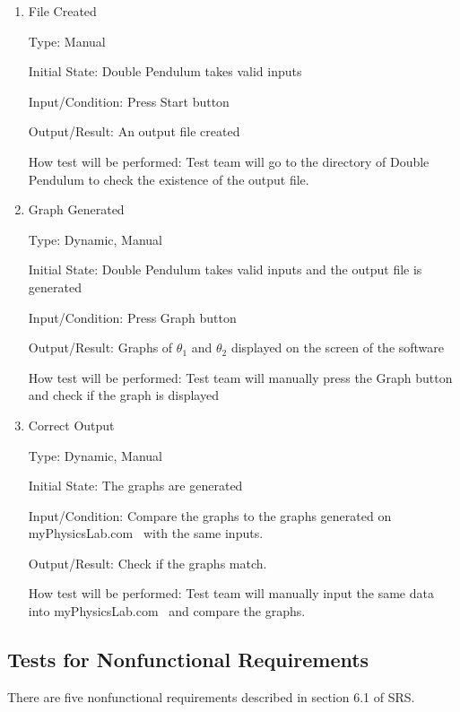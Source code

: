 \documentclass[12pt, titlepage]{article}
\begin{document}
\begin{enumerate}

\item{File Created}  

Type: Manual
          
Initial State: Double Pendulum takes valid inputs
          
Input/Condition: Press Start button
          
Output/Result: An output file created 
          
How test will be performed: Test team will go to the directory of Double Pendulum to check the existence of the output file.

          
\item{Graph Generated} 

Type: Dynamic, Manual 
          
Initial State: Double Pendulum takes valid inputs and the output file is generated 
          
Input/Condition: Press Graph button 
          
Output/Result: Graphs of $\theta_1$ and $\theta_2$ displayed on the screen of the software 
          
How test will be performed: Test team will manually press the Graph button and check if the graph is displayed

\item{Correct Output}  

Type: Dynamic, Manual 
          
Initial State: The graphs are generated 
          
Input/Condition: Compare the graphs to the graphs generated on myPhysicsLab.com~\cite{Double_Pendulum} with the same inputs.
          
Output/Result: Check if the graphs match.
          
How test will be performed: Test team will manually input the same data into myPhysicsLab.com~\cite{Double_Pendulum} and compare the graphs.


\end{enumerate}


\subsection{Tests for Nonfunctional Requirements}

There are five nonfunctional requirements described in section 6.1 of SRS.
\end{document}
